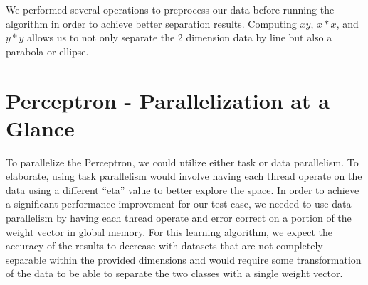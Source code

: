 \documentclass{article}
\begin{document}
We performed several operations to preprocess our data before running the algorithm in order to achieve better separation results. Computing $xy$, $x*x$, and $y*y$ allows us to not only separate the 2 dimension data by line but also a parabola or ellipse. 



\clearpage
\section{Perceptron - Parallelization at a Glance}
To parallelize the Perceptron, we could utilize either task or data parallelism. To elaborate, using task parallelism would involve having each thread operate on the data using a different ``eta'' value to better explore the space. In order to achieve a significant performance improvement for our test case, we needed to use data parallelism by having each thread operate and error correct on a portion of the weight vector in global memory. For this learning algorithm, we expect the accuracy of the results to decrease with datasets that are not completely separable within the provided dimensions and would require some transformation of the data to be able to separate the two classes with a single weight vector.
\end{document}
